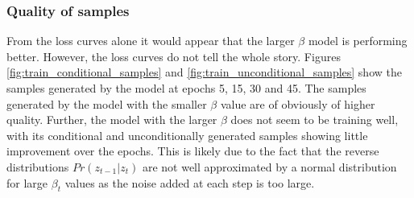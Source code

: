\documentclass[11pt]{article}
\begin{document}
\subsubsection{Quality of samples}
From the loss curves alone it would appear that the larger $\beta$ model is performing better. However, the loss curves do not tell the whole story. Figures \ref{fig:train_conditional_samples} and \ref{fig:train_unconditional_samples} show the samples generated by the model at epochs 5, 15, 30 and 45. The samples generated by the model with the smaller $\beta$ value are of obviously of higher quality. Further, the model with the larger $\beta$ does not seem to be training well, with its conditional and unconditionally generated samples showing little improvement over the epochs. This is likely due to the fact that the reverse distributions $Pr(z_{t-1}|z_{t})$ are not well approximated by a normal distribution for large $\beta_t$ values as the noise added at each step is too large.
\end{document}
